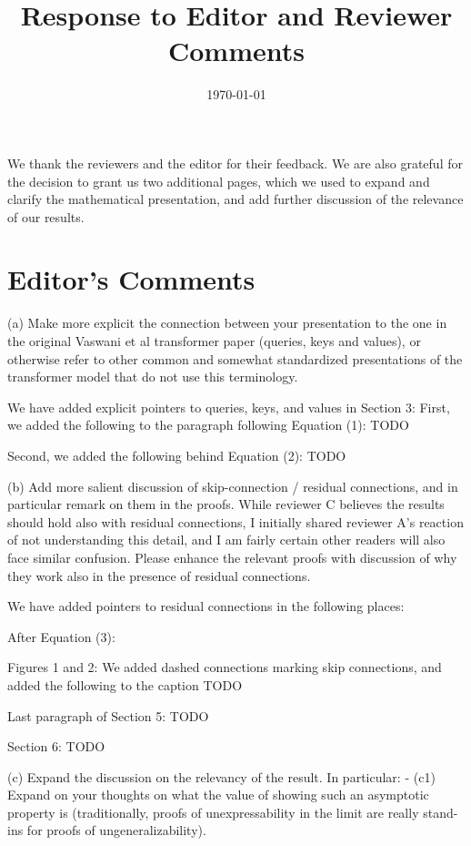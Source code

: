 \documentclass[11pt,a4paper]{article}
\title{Response to Editor and Reviewer Comments}
\date{\today}
\newcommand\response[1]{{\color{blue}#1}}
\begin{document}
\maketitle 

\response{We thank the reviewers and the editor for their feedback.
We are also grateful for the decision to grant us two additional pages, which we used to expand and clarify the mathematical presentation, and add further discussion of the relevance of our results.}

\section{Editor's Comments}

(a) Make more explicit the connection between your presentation to the one
in the original Vaswani et al transformer paper (queries, keys and values),
or otherwise refer to other common and somewhat standardized presentations
of the transformer model that do not use this terminology.

\response{We have added explicit pointers to queries, keys, and values in Section 3: First, we added the following to the paragraph following Equation (1): TODO}

\response{Second, we added the following behind Equation (2): TODO}

(b) Add more salient discussion of skip-connection / residual connections,
and in particular remark on them in the proofs. While reviewer C believes
the results should hold also with residual connections, I initially shared
reviewer A's reaction of not understanding this detail, and I am fairly
certain other readers will also face similar confusion. Please enhance the
relevant proofs with discussion of why they work also in the presence of
residual connections.

\response{We have added pointers to residual connections in the following places:}

\response{After Equation (3):}

\response{Figures 1 and 2: We added dashed connections marking skip connections, and added the following to the caption TODO}

\response{Last paragraph of Section 5: TODO}

\response{Section 6: TODO}

(c) Expand the discussion on the relevancy of the result. In particular:
- (c1) Expand on your thoughts on what the value of showing such an
asymptotic property is (traditionally, proofs of unexpressability in the
limit are really stand-ins for proofs of ungeneralizability).
\end{document}

